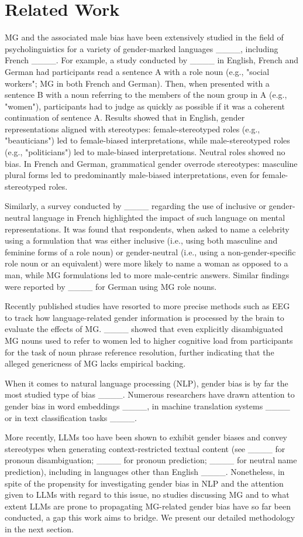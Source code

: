 \section{Related Work}
MG and the associated male bias have been extensively studied in the field of psycholinguistics for a variety of gender-marked languages ____, including French ____. For example, a study conducted by ____ in English, French and German had participants read a sentence A with a role noun (e.g., "social workers"; MG in both French and German). Then, when presented with a sentence B with a noun referring to the members of the noun group in A (e.g., "women"), participants had to judge as quickly as possible if it was a coherent continuation of sentence A. Results showed that in English, gender representations aligned with stereotypes: female-stereotyped roles (e.g., "beauticians") led to female-biased interpretations, while male-stereotyped roles (e.g., "politicians") led to male-biased interpretations. Neutral roles showed no bias. In French and German, grammatical gender overrode stereotypes: masculine plural forms led to predominantly male-biased interpretations, even for female-stereotyped roles.

Similarly, a survey conducted by ____ regarding the use of inclusive or gender-neutral language in French highlighted the impact of such language on mental representations. It was found that respondents, when asked to name a celebrity using a formulation that was either inclusive (i.e., using both masculine and feminine forms of a role noun) or gender-neutral (i.e., using a non-gender-specific role noun or an equivalent) were more likely to name a woman as opposed to a man, while MG formulations led to more male-centric answers. Similar findings were reported by ____ for German using MG role nouns.

Recently published studies have resorted to more precise methods such as EEG to track how language-related gender information is processed by the brain to evaluate the effects of MG. ____ showed that even explicitly disambiguated
MG nouns used to refer to women led to higher cognitive load from participants for the task of noun phrase reference resolution, further indicating that the alleged genericness of MG lacks empirical backing.

When it comes to natural language processing (NLP), gender bias is by far the most studied type of bias ____. Numerous researchers have drawn attention to gender bias in word embeddings ____, in machine translation systems ____ or in text classification tasks ____.

More recently, LLMs too have been shown to exhibit gender biases and convey stereotypes when generating context-restricted textual content (see ____ for pronoun disambiguation; ____ for pronoun prediction; ____ for neutral name prediction), including in languages other than English ____. Nonetheless, in spite of the propensity for investigating gender bias in NLP and the attention given to LLMs with regard to this issue, no studies discussing MG and to what extent LLMs are prone to propagating MG-related gender bias have so far been conducted, a gap this work aims to bridge. We present our detailed methodology in the next section.
